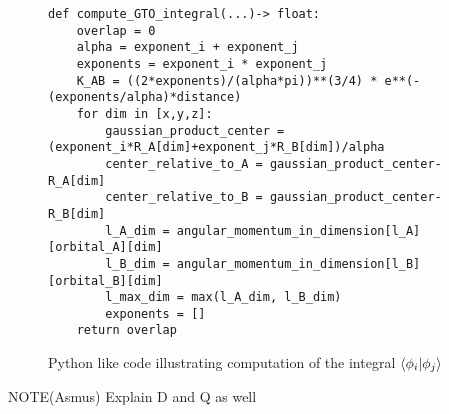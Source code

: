 \begin{figure}[H]
\begin{verbatim}
def compute_GTO_integral(...)-> float:
    overlap = 0
    alpha = exponent_i + exponent_j
    exponents = exponent_i * exponent_j
    K_AB = ((2*exponents)/(alpha*pi))**(3/4) * e**(-(exponents/alpha)*distance)
    for dim in [x,y,z]:
        gaussian_product_center = (exponent_i*R_A[dim]+exponent_j*R_B[dim])/alpha
        center_relative_to_A = gaussian_product_center-R_A[dim]
        center_relative_to_B = gaussian_product_center-R_B[dim]
        l_A_dim = angular_momentum_in_dimension[l_A][orbital_A][dim]
        l_B_dim = angular_momentum_in_dimension[l_B][orbital_B][dim]
        l_max_dim = max(l_A_dim, l_B_dim)
        exponents = [] 
    return overlap
\end{verbatim}
    \caption{Python like code illustrating computation of the integral $\braket{\phi_i|\phi_j}$}
\end{figure}
NOTE(Asmus) Explain D and Q as well


